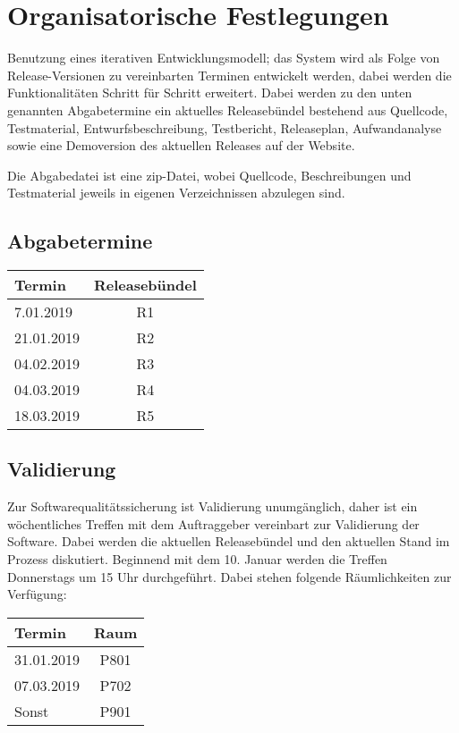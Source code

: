\chapter{Organisatorische Festlegungen}
	Benutzung eines iterativen Entwicklungsmodell; das System wird als Folge von Release-Versionen zu vereinbarten Terminen entwickelt werden, dabei werden die Funktionalitäten Schritt für Schritt erweitert. Dabei werden zu den unten genannten Abgabetermine ein aktuelles Releasebündel bestehend aus Quellcode, Testmaterial, Entwurfsbeschreibung, Testbericht, Releaseplan, Aufwandanalyse sowie eine Demoversion des aktuellen Releases auf der Website.

	Die Abgabedatei ist eine zip-Datei, wobei Quellcode, Beschreibungen und Testmaterial jeweils in eigenen Verzeichnissen abzulegen sind.

	\section{Abgabetermine}
		\begin{center}
			\begin{tabularx}{\textwidth/2}{Xc}
				\textbf{Termin}&\textbf{Releasebündel}\\\hline
				7.01.2019&R1\\
				21.01.2019&R2\\
				04.02.2019&R3\\
				04.03.2019&R4\\
				18.03.2019&R5\\
			\end{tabularx}
		\end{center}

	\section{Validierung}
		Zur Softwarequalitätssicherung ist Validierung unumgänglich, daher ist ein wöchentliches Treffen mit dem Auftraggeber vereinbart zur Validierung der Software. Dabei werden die aktuellen Releasebündel und den aktuellen Stand im Prozess diskutiert. Beginnend mit dem 10. Januar werden die Treffen Donnerstags um 15 Uhr durchgeführt. Dabei stehen folgende Räumlichkeiten zur Verfügung:
		\begin{center}
			\begin{tabularx}{\textwidth/2}{Xc}
				\textbf{Termin}&\textbf{Raum}\\\hline
				31.01.2019&P801\\
				07.03.2019&P702\\
				Sonst&P901\\
			\end{tabularx}
		\end{center}
